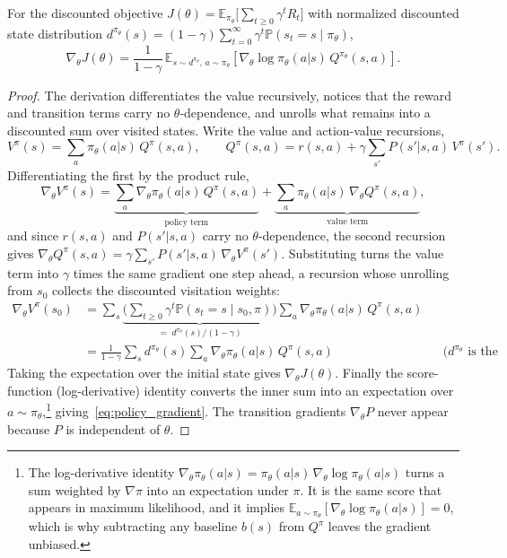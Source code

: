 \begin{theorem}
\label{thm:policy_gradient}
For the discounted objective $J(\theta) = \mathbb{E}_{\pi_\theta}\big[\sum_{t \geq 0} \gamma^t R_t\big]$ with normalized discounted state distribution $d^{\pi_\theta}(s) = (1-\gamma) \sum_{t=0}^\infty \gamma^t \mathbb{P}(s_t = s \mid \pi_\theta)$,
\begin{equation}
\nabla_\theta J(\theta) = \frac{1}{1-\gamma}\, \mathbb{E}_{s \sim d^{\pi_\theta},\, a \sim \pi_\theta} \left[ \nabla_\theta \log \pi_\theta(a|s) \, Q^{\pi_\theta}(s,a) \right].
\label{eq:policy_gradient}
\end{equation}
\end{theorem}

\begin{proof}
The derivation differentiates the value recursively, notices that the reward and transition terms carry no $\theta$-dependence, and unrolls what remains into a discounted sum over visited states. Write the value and action-value recursions,
\[
V^{\pi}(s) = \sum_a \pi_\theta(a|s)\, Q^\pi(s,a), \qquad Q^\pi(s,a) = r(s,a) + \gamma \sum_{s'} P(s'|s,a)\, V^\pi(s').
\]
Differentiating the first by the product rule,
\[
\nabla_\theta V^\pi(s) = \underbrace{\sum_a \nabla_\theta \pi_\theta(a|s)\, Q^\pi(s,a)}_{\text{policy term}} + \underbrace{\sum_a \pi_\theta(a|s)\, \nabla_\theta Q^\pi(s,a)}_{\text{value term}} ,
\]
and since $r(s,a)$ and $P(s'|s,a)$ carry no $\theta$-dependence, the second recursion gives $\nabla_\theta Q^\pi(s,a) = \gamma \sum_{s'} P(s'|s,a)\, \nabla_\theta V^\pi(s')$. Substituting turns the value term into $\gamma$ times the same gradient one step ahead, a recursion whose unrolling from $s_0$ collects the discounted visitation weights:
\begin{align*}
\nabla_\theta V^\pi(s_0)
  &= \sum_s \underbrace{\Big(\sum_{t \geq 0} \gamma^t \mathbb{P}(s_t = s \mid s_0, \pi)\Big)}_{=\; d^{\pi_\theta}(s)/(1-\gamma)} \sum_a \nabla_\theta \pi_\theta(a|s)\, Q^\pi(s,a) \\
  &= \frac{1}{1-\gamma} \sum_s d^{\pi_\theta}(s) \sum_a \nabla_\theta \pi_\theta(a|s)\, Q^\pi(s,a)
    && \text{($d^{\pi_\theta}$ is the normalized occupancy).}
\end{align*}
Taking the expectation over the initial state gives $\nabla_\theta J(\theta)$. Finally the score-function (log-derivative) identity converts the inner sum into an expectation over $a \sim \pi_\theta$,\footnote{The log-derivative identity $\nabla_\theta \pi_\theta(a|s) = \pi_\theta(a|s)\, \nabla_\theta \log \pi_\theta(a|s)$ turns a sum weighted by $\nabla\pi$ into an expectation under $\pi$. It is the same score that appears in maximum likelihood, and it implies $\mathbb{E}_{a\sim\pi_\theta}[\nabla_\theta \log \pi_\theta(a|s)] = 0$, which is why subtracting any baseline $b(s)$ from $Q^\pi$ leaves the gradient unbiased.} giving~\eqref{eq:policy_gradient}. The transition gradients $\nabla_\theta P$ never appear because $P$ is independent of $\theta$.
\end{proof}

